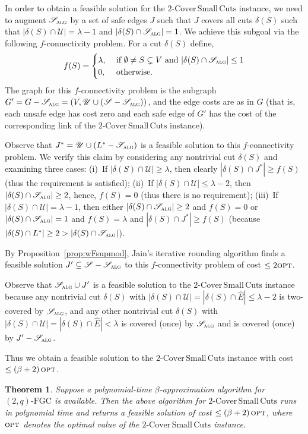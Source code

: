 \documentclass[11pt]{article}
\newtheorem{theorem}{Theorem}
\newcommand{\opt}{\textsc{opt}}
\newcommand{\safe}{\mathscr{S}}
\newcommand{\unsafe}{\mathscr{U}}
\newcommand{\fgc}{\mathrm{FGC}}
\newcommand{\J}{{J}}
\newcommand{\alg}{\textsc{alg}}
\newcommand{\twoqfgc}{(2,q)\text{-}\fgc}
\newcommand\capbound{\lambda}
\newcommand\hE{\hat{E}}
\newcommand\twoASC{\mathrm{2\text{-}Cover\,Small\,Cuts}}
\begin{document}
{{In order to obtain a feasible solution for the $\twoASC$ instance,
we need to augment $\safe_{\alg}$ by a set of safe edges $\J$ such
that $\J$ covers all cuts $\delta(S)$ such that
$|\delta(S)\cap\unsafe|=\capbound-1$ and $|\delta(S)\cap\safe_{\alg}|=1$.
We achieve this subgoal via the following $f$-connectivity problem.
For a cut $\delta(S)$ define,
\[
f(S) = \begin{cases}
    \capbound , &\text{ if } \emptyset\neq{S}\subsetneq{V} \text{ and } |\delta(S)\cap \safe_{\alg}| \leq 1 \\ 0, &\text{ otherwise}.
\end{cases}
\]
The graph for this $f$-connectivity problem is the subgraph $G' =
G - \safe_{\alg} = (V,\unsafe\cup (\safe - \safe_{\alg}))$, and the
edge costs are as in $G$ (that is, each unsafe edge has cost zero
and each safe edge of $G'$ has the cost of the corresponding link
of the $\twoASC$ instance).


Observe that $J^* = \unsafe \cup (L^* - \safe_{\alg})$
is a feasible solution to this $f$-connectivity problem.
We verify this claim by considering any nontrivial cut $\delta(S)$ and
examining three cases:
(i)~If $|\delta(S)\cap\unsafe| \geq \capbound$, then clearly
$|\delta(S)\cap{J^*}|\geq f(S)$ (thus the requirement is satisfied);
(ii)~If $|\delta(S)\cap\unsafe| \leq \capbound-2$, then
$|\delta(S)\cap\safe_{\alg}|\geq2$, hence, $f(S)=0$ (thus there is no requirement);
(iii)~If $|\delta(S)\cap\unsafe| = \capbound-1$, then
either $|\delta(S)\cap\safe_{\alg}|\geq2$ and $f(S)=0$
or $|\delta(S)\cap\safe_{\alg}|=1$ and $f(S)=\capbound$
and $|\delta(S)\cap{J^*}|\geq f(S)$
(because $|\delta(S)\cap{L^*}|\geq2>|\delta(S)\cap\safe_{\alg}|$).


By Proposition~\ref{prop:wFsupmod}, Jain's iterative rounding
algorithm finds a feasible solution $\J'\subseteq{\safe-\safe_{\alg}}$
to this $f$-connectivity problem of cost $\leq 2\opt$.

Observe that $\safe_{\alg}\cup{\J'}$ is a feasible solution to the
$\twoASC$ instance because
any nontrivial cut $\delta(S)$ with
$|\delta(S)\cap\unsafe|=|\delta(S)\cap\hE|\leq\capbound-2$ is
two-covered by $\safe_{\alg}$, and any other nontrivial cut $\delta(S)$
with $|\delta(S)\cap\unsafe|=|\delta(S)\cap\hE|<\capbound$ is covered
(once) by $\safe_{\alg}$ and is covered (once) by $\J'-\safe_{\alg}$.

Thus we obtain a feasible solution to the $\twoASC$ instance with
cost $\leq(\beta+2)\, \opt$.


\begin{theorem} \label{thm:approx-twoASC}
Suppose a polynomial-time $\beta$-approximation algorithm
for $\twoqfgc$ is available.
Then the above algorithm for $\twoASC$ runs in polynomial time and
returns a feasible solution of cost $\leq (\beta+2)\, \opt$,
where $\opt$ denotes the optimal value of the $\twoASC$ instance.
\end{theorem}

}}
\end{document}
